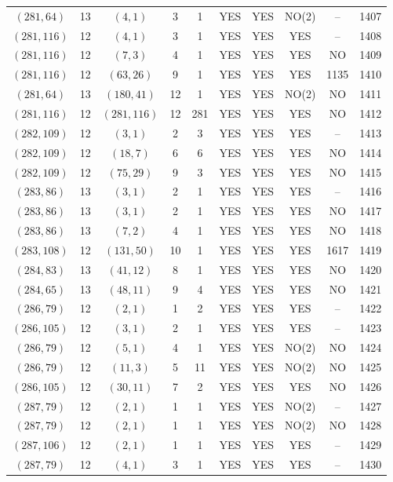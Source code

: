 \begin{longtable}{|c|c|c|c|c|c|c|c|c|c|}
$(281, 64)$ & 13 & $(4, 1)$ & 3 & 1 & YES & YES & NO(2) & -- & 1407\\
$(281, 116)$ & 12 & $(4, 1)$ & 3 & 1 & YES & YES & YES & -- & 1408\\
$(281, 116)$ & 12 & $(7, 3)$ & 4 & 1 & YES & YES & YES & NO & 1409\\
$(281, 116)$ & 12 & $(63, 26)$ & 9 & 1 & YES & YES & YES & 1135 & 1410\\
$(281, 64)$ & 13 & $(180, 41)$ & 12 & 1 & YES & YES & NO(2) & NO & 1411\\
$(281, 116)$ & 12 & $(281, 116)$ & 12 & 281 & YES & YES & YES & NO & 1412\\
$(282, 109)$ & 12 & $(3, 1)$ & 2 & 3 & YES & YES & YES & -- & 1413\\
$(282, 109)$ & 12 & $(18, 7)$ & 6 & 6 & YES & YES & YES & NO & 1414\\
$(282, 109)$ & 12 & $(75, 29)$ & 9 & 3 & YES & YES & YES & NO & 1415\\
$(283, 86)$ & 13 & $(3, 1)$ & 2 & 1 & YES & YES & YES & -- & 1416\\
$(283, 86)$ & 13 & $(3, 1)$ & 2 & 1 & YES & YES & YES & NO & 1417\\
$(283, 86)$ & 13 & $(7, 2)$ & 4 & 1 & YES & YES & YES & NO & 1418\\
$(283, 108)$ & 12 & $(131, 50)$ & 10 & 1 & YES & YES & YES & 1617 & 1419\\
$(284, 83)$ & 13 & $(41, 12)$ & 8 & 1 & YES & YES & YES & NO & 1420\\
$(284, 65)$ & 13 & $(48, 11)$ & 9 & 4 & YES & YES & YES & NO & 1421\\
$(286, 79)$ & 12 & $(2, 1)$ & 1 & 2 & YES & YES & YES & -- & 1422\\
$(286, 105)$ & 12 & $(3, 1)$ & 2 & 1 & YES & YES & YES & -- & 1423\\
$(286, 79)$ & 12 & $(5, 1)$ & 4 & 1 & YES & YES & NO(2) & NO & 1424\\
$(286, 79)$ & 12 & $(11, 3)$ & 5 & 11 & YES & YES & NO(2) & NO & 1425\\
$(286, 105)$ & 12 & $(30, 11)$ & 7 & 2 & YES & YES & YES & NO & 1426\\
$(287, 79)$ & 12 & $(2, 1)$ & 1 & 1 & YES & YES & NO(2) & -- & 1427\\
$(287, 79)$ & 12 & $(2, 1)$ & 1 & 1 & YES & YES & NO(2) & NO & 1428\\
$(287, 106)$ & 12 & $(2, 1)$ & 1 & 1 & YES & YES & YES & -- & 1429\\
$(287, 79)$ & 12 & $(4, 1)$ & 3 & 1 & YES & YES & YES & -- & 1430\\

\end{longtable}
